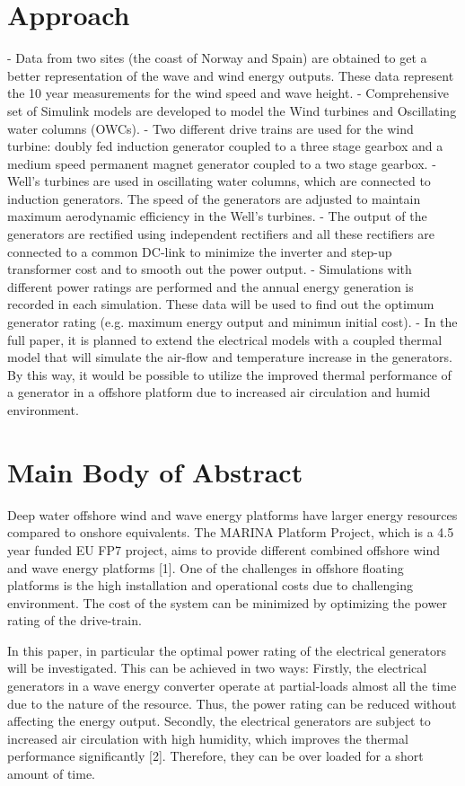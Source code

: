 \documentclass[twocolumn]{article}
\begin{document}
\section{Approach}
- Data from two sites (the coast of Norway and Spain) are obtained to get a better representation of the wave and wind energy outputs. These data represent the 10 year measurements for the wind speed and wave height.
- Comprehensive set of Simulink models are developed to model the Wind turbines and Oscillating water columns (OWCs).
- Two different drive trains are used for the wind turbine: doubly fed induction generator coupled to a three stage gearbox and a medium speed permanent magnet generator coupled to a two stage gearbox.
- Well's turbines are used in oscillating water columns, which are connected to induction generators. The speed of the generators are adjusted to maintain maximum aerodynamic efficiency in the Well's turbines.
- The output of the generators are rectified using independent rectifiers and all these rectifiers are connected to a common DC-link to minimize the inverter and step-up transformer cost and to smooth out the power output.
- Simulations with different power ratings are performed and the annual energy generation is recorded in each simulation. These data will be used to find out the optimum generator rating (e.g. maximum energy output and minimun initial cost).
- In the full paper, it is planned to extend the electrical models with a coupled thermal model that will simulate the air-flow and temperature increase in the generators. By this way, it would be possible to utilize the improved thermal performance of a generator in a offshore platform due to increased air circulation and humid environment.

\section{Main Body of Abstract}

Deep water offshore wind and wave energy platforms have larger energy resources compared to onshore equivalents. The MARINA Platform Project, which is a 4.5 year funded EU FP7 project, aims to provide different combined offshore wind and wave energy platforms [1]. One of the challenges in offshore floating platforms is the high installation and operational costs due to challenging environment. The cost of the system can be minimized by optimizing the power rating of the drive-train. 

In this paper, in particular the optimal power rating of the electrical generators will be investigated. This can be achieved in two ways: Firstly, the electrical generators in a wave energy converter operate at partial-loads almost all the time due to the nature of the resource. Thus, the power rating can be reduced without affecting the energy output. Secondly, the electrical generators are subject to increased air circulation with high humidity, which improves the thermal performance significantly [2]. Therefore, they can be over loaded for a short amount of time.
\end{document}
